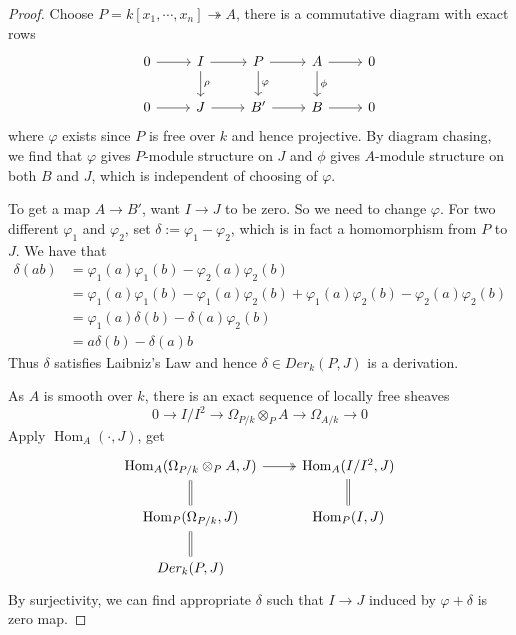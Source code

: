 \documentclass{ctexart}
\renewcommand{\hom}{\operatorname{Hom}}
\begin{document}
\begin{proof}
    Choose $P = k[x_{1}, \cdots, x_{n}] \twoheadrightarrow A$,
    there is a commutative diagram with exact rows 
    \begin{equation}
        \begin{tikzcd}
            0 \arrow[r] &
            I \arrow[r] \arrow[d, "\rho"] &
            P \arrow[r] \arrow[d, "\varphi"] &
            A \arrow[r] \arrow[d, "\phi"] &
            0 \\
            0 \arrow[r] &
            J \arrow[r] &
            B' \arrow[r] &
            B \arrow[r] &
            0  
        \end{tikzcd}
    \end{equation}
    where $\varphi$ exists since $P$ is free over $k$ and hence projective.
    By diagram chasing, we find that $\varphi$ gives $P$-module structure on $J$ and $\phi$ gives $A$-module structure on both $B$ and $J$, which is independent of choosing of $\varphi$.
    \par
    To get a map $A \rightarrow B'$, want $I \rightarrow J$ to be zero.
    So we need to change $\varphi$.
    For two different $\varphi_{1}$ and $\varphi_{2}$, set $\delta := \varphi_{1} - \varphi_{2}$,
    which is in fact a homomorphism from $P$ to $J$.
    We have that 
    \begin{equation}
        \begin{split}
            \delta(ab) & = \varphi_{1}(a)\varphi_{1}(b) - \varphi_{2}(a)\varphi_{2}(b) \\
            & = \varphi_{1}(a)\varphi_{1}(b) - \varphi_{1}(a)\varphi_{2}(b) + \varphi_{1}(a)\varphi_{2}(b)- \varphi_{2}(a)\varphi_{2}(b) \\
            & = \varphi_{1}(a)\delta(b) - \delta(a)\varphi_{2}(b) \\
            & = a\delta(b) - \delta(a)b
        \end{split}
    \end{equation}
    Thus $\delta$ satisfies Laibniz's Law and hence $\delta\in Der_{k}(P, J)$ is a derivation.
    \par
    As $A$ is smooth over $k$, there is an exact sequence of locally free sheaves 
    \begin{equation}
        0 \longrightarrow I/I^{2} \longrightarrow \Omega_{P/k} \otimes_{P} A \longrightarrow \Omega_{A/k} \longrightarrow 0
    \end{equation}
    Apply $\hom_{A}(\cdot, J)$, get
    \begin{equation}
        \begin{tikzcd}
            \hom_{A}(\Omega_{P/k} \otimes_{P} A, J) \arrow[r, twoheadrightarrow] \arrow[d, equal] &
            \hom_{A}(I/I^{2}, J) \arrow[d, equal] \\
            \hom_{P}(\Omega_{P/k}, J) \arrow[d, equal] &
            \hom_{P}(I, J) \\
            Der_{k}(P, J) &
        \end{tikzcd}
    \end{equation}
    By surjectivity, we can find appropriate $\delta$ such that $I \rightarrow J$ induced by $\varphi + \delta$ is zero map.
\end{proof}
\end{document}
